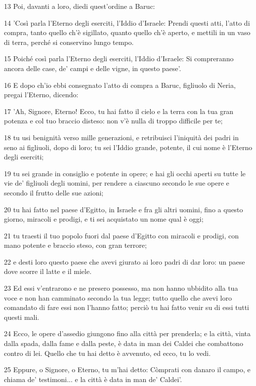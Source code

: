 \par 13 Poi, davanti a loro, diedi quest'ordine a Baruc:
\par 14 'Così parla l'Eterno degli eserciti, l'Iddio d'Israele: Prendi questi atti, l'atto di compra, tanto quello ch'è sigillato, quanto quello ch'è aperto, e mettili in un vaso di terra, perché si conservino lungo tempo.
\par 15 Poiché così parla l'Eterno degli eserciti, l'Iddio d'Israele: Si compreranno ancora delle case, de' campi e delle vigne, in questo paese'.
\par 16 E dopo ch'io ebbi consegnato l'atto di compra a Baruc, figliuolo di Neria, pregai l'Eterno, dicendo:
\par 17 'Ah, Signore, Eterno! Ecco, tu hai fatto il cielo e la terra con la tua gran potenza e col tuo braccio disteso: non v'è nulla di troppo difficile per te;
\par 18 tu usi benignità verso mille generazioni, e retribuisci l'iniquità dei padri in seno ai figliuoli, dopo di loro; tu sei l'Iddio grande, potente, il cui nome è l'Eterno degli eserciti;
\par 19 tu sei grande in consiglio e potente in opere; e hai gli occhi aperti su tutte le vie de' figliuoli degli uomini, per rendere a ciascuno secondo le sue opere e secondo il frutto delle sue azioni;
\par 20 tu hai fatto nel paese d'Egitto, in Israele e fra gli altri uomini, fino a questo giorno, miracoli e prodigi, e ti sei acquistato un nome qual è oggi;
\par 21 tu traesti il tuo popolo fuori dal paese d'Egitto con miracoli e prodigi, con mano potente e braccio steso, con gran terrore;
\par 22 e desti loro questo paese che avevi giurato ai loro padri di dar loro: un paese dove scorre il latte e il miele.
\par 23 Ed essi v'entrarono e ne presero possesso, ma non hanno ubbidito alla tua voce e non han camminato secondo la tua legge; tutto quello che avevi loro comandato di fare essi non l'hanno fatto; perciò tu hai fatto venir su di essi tutti questi mali.
\par 24 Ecco, le opere d'assedio giungono fino alla città per prenderla; e la città, vinta dalla spada, dalla fame e dalla peste, è data in man dei Caldei che combattono contro di lei. Quello che tu hai detto è avvenuto, ed ecco, tu lo vedi.
\par 25 Eppure, o Signore, o Eterno, tu m'hai detto: Còmprati con danaro il campo, e chiama de' testimoni... e la città è data in man de' Caldei'.
